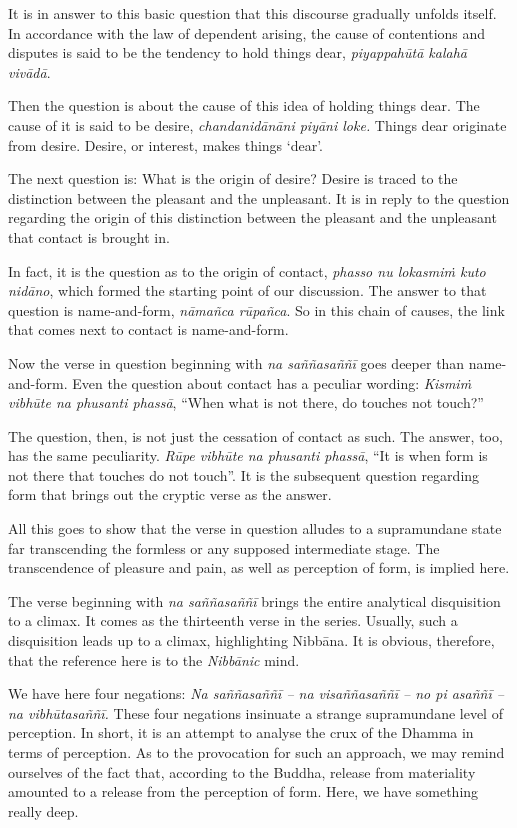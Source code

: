 It is in answer to this basic question that this discourse gradually unfolds itself. In accordance with the law of dependent arising, the cause of contentions and disputes is said to be the tendency to hold things dear, \emph{piyappahūtā kalahā vivādā}.

Then the question is about the cause of this idea of holding things dear. The cause of it is said to be desire, \emph{chandanidānāni piyāni loke.} Things dear originate from desire. Desire, or interest, makes things `dear'.

The next question is: What is the origin of desire? Desire is traced to the distinction between the pleasant and the unpleasant. It is in reply to the question regarding the origin of this distinction between the pleasant and the unpleasant that contact is brought in.

In fact, it is the question as to the origin of contact, \emph{phasso nu lokasmiṁ kuto nidāno}, which formed the starting point of our discussion. The answer to that question is name-and-form, \emph{nāmañca rūpañca}. So in this chain of causes, the link that comes next to contact is name-and-form.

Now the verse in question beginning with \emph{na saññasaññī} goes deeper than name-and-form. Even the question about contact has a peculiar wording: \emph{Kismiṁ vibhūte na phusanti phassā}, ``When what is not there, do touches not touch?''

The question, then, is not just the cessation of contact as such. The answer, too, has the same peculiarity. \emph{Rūpe vibhūte na phusanti phassā}, ``It is when form is not there that touches do not touch''. It is the subsequent question regarding form that brings out the cryptic verse as the answer.

All this goes to show that the verse in question alludes to a supramundane state far transcending the formless or any supposed intermediate stage. The transcendence of pleasure and pain, as well as perception of form, is implied here.

The verse beginning with \emph{na saññasaññī} brings the entire analytical disquisition to a climax. It comes as the thirteenth verse in the series. Usually, such a disquisition leads up to a climax, highlighting Nibbāna. It is obvious, therefore, that the reference here is to the \emph{Nibbānic} mind.

We have here four negations: \emph{Na saññasaññī -- na visaññasaññī -- no pi asaññī -- na vibhūtasaññī.} These four negations insinuate a strange supramundane level of perception. In short, it is an attempt to analyse the crux of the Dhamma in terms of perception. As to the provocation for such an approach, we may remind ourselves of the fact that, according to the Buddha, release from materiality amounted to a release from the perception of form. Here, we have something really deep.

